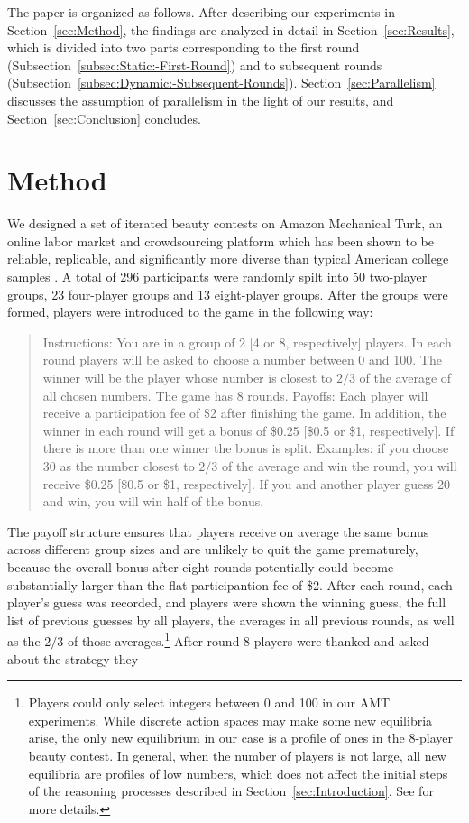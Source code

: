 \documentclass[12pt,review]{elsarticle}
\begin{document}
The paper is organized as follows. After describing our experiments
in Section~\ref{sec:Method}, the findings are analyzed in detail
in Section~\ref{sec:Results}, which is divided into two parts corresponding
to the first round (Subsection~\ref{subsec:Static:-First-Round})
and to subsequent rounds (Subsection~\ref{subsec:Dynamic:-Subsequent-Rounds}).
Section~\ref{sec:Parallelism} discusses the assumption of parallelism
in the light of our results, and Section~\ref{sec:Conclusion} concludes. 

\section{Method\label{sec:Method}}
\noindent
We designed a set of iterated beauty contests on Amazon Mechanical
Turk, an online labor market and crowdsourcing platform which has
been shown to be reliable, replicable, and significantly more diverse
than typical American college samples \citep{BuhrmesterEtAl2011,CrumpEtAl13,HortonEtAl2011,Rand2012}.
A total of 296 participants were randomly spilt into 50 two-player
groups, 23 four-player groups and 13 eight-player groups. After the
groups were formed, players were introduced to the game in the following
way:
\begin{quote}
Instructions: You are in a group of 2 {[}4 or 8, respectively{]} players.
In each round players will be asked to choose a number between 0 and
100. The winner will be the player whose number is closest to $2/3$
of the average of all chosen numbers. The game has 8 rounds. Payoffs:
Each player will receive a participation fee of \$2 after finishing
the game. In addition, the winner in each round will get a bonus of
\$0.25 {[}\$0.5 or \$1, respectively{]}. If there is more than one
winner the bonus is split. Examples: if you choose 30 as the number
closest to $2/3$ of the average and win the round, you will receive
\$0.25 {[}\$0.5 or \$1, respectively{]}. If you and another player
guess 20 and win, you will win half of the bonus.
\end{quote}
The payoff structure ensures that players receive on average the same
bonus across different group sizes and are unlikely to quit the game
prematurely, because the overall bonus after eight rounds potentially could become substantially larger than the flat participantion fee of \$2. After each round, each player's guess was recorded, and
players were shown the winning guess, the full list of previous guesses
by all players, the averages in all previous rounds, as well as the
$2/3$ of those averages.\footnote{Players could only select integers between 0 and 100 in our AMT experiments.
While discrete action spaces may make some new equilibria arise, the
only new equilibrium in our case is a profile of ones in the 8-player
beauty contest. In general, when the number of players is not large,
all new equilibria are profiles of low numbers, which does not affect
the initial steps of the reasoning processes described in Section~\ref{sec:Introduction}.
See \citet{SeelTsakas17} for more details.} After round 8 players were thanked and asked about the strategy they
\end{document}
